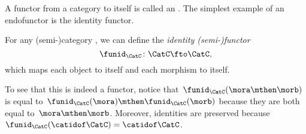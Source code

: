 
A functor from a category to itself is called an \emph{}.
The simplest example of an endofunctor is the identity functor.

\begin{definition}
    For any (semi-)category \CatC, we can define the \emph{identity (semi-)functor}
    \begin{equation}
        \funid_\CatC \colon \CatC \fto \CatC,
    \end{equation}
    which maps each object to itself and each morphism to itself.
\end{definition}

To see that this is indeed a functor, notice that~$\funid_\CatC(\mora \mthen \morb)$ is equal to~$\funid_\CatC(\mora)\mthen \funid_\CatC(\morb)$ because they are both equal to~$\mora \mthen \morb$.
Moreover, identities are preserved because~$\funid_\CatC(\catidof\CatC)=\catidof\CatC$.

